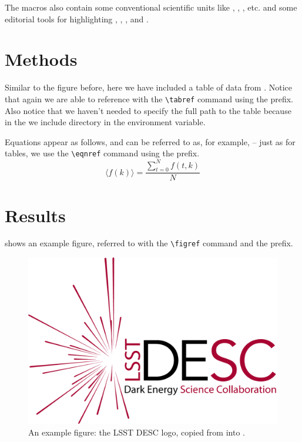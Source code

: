 \documentclass[\docopts]{\docclass}
\begin{document}
The  macros also contain some conventional scientific units like \angstrom, \GeV, \Msun, etc. and some editorial tools for highlighting , , , and .



\section{Methods}
\label{sec:methods}

Similar to the figure before, here we have included a table of data from .
Notice that again we are able to reference  with the \verb=\tabref= command using the  prefix.
Also notice that we haven't needed to specify the full path to the table because in the  we include  directory in the  environment variable.



Equations appear as follows, and can be referred to as, for example,  -- just as for tables, we use the \verb=\eqnref= command using the  prefix.
\begin{equation}
  \label{eqn:example}
  \langle f(k) \rangle = \frac{ \sum_{t=0}^{N}f(t,k) }{N}
\end{equation}



\section{Results}
\label{sec:results}

 shows an example figure, referred to with the \verb=\figref= command and the  prefix.

\begin{figure}
\includegraphics[width=0.9\columnwidth]{example.png}
\caption{An example figure: the LSST DESC logo, copied from  into . \label{fig:example}}
\end{figure}
\end{document}
